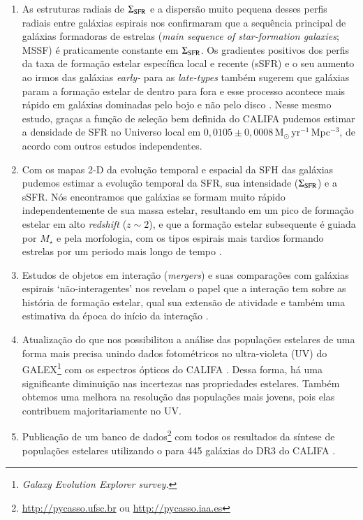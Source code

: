 \begin{enumerate}[label=(\roman*)]
  \item As estruturas radiais de $\Sigma_{\rm SFR}$ e a dispersão muito pequena desses perfis radiais entre galáxias espirais nos confirmaram que a sequência principal de galáxias formadoras de estrelas ({\em main sequence of star-formation galaxies}; MSSF) é praticamente constante em $\Sigma_{\rm SFR}$. Os gradientes positivos dos perfis da taxa de formação estelar específica local e recente (sSFR) e o seu aumento ao irmos das galáxias {\em early-} para as {\em late-types} também sugerem que galáxias param a formação estelar de dentro para fora e esse processo acontece mais rápido em galáxias dominadas pelo bojo e não pelo disco \citep{GonzalezDelgado.etal.2016a}. Nesse mesmo estudo, graças a função de seleção bem definida do CALIFA \citep{Walcher.etal.2014} pudemos estimar a densidade de SFR no Universo local em $0,0105 \pm 0,0008\,$M$_\odot\,$yr$^{-1}\,$Mpc$^{-3}$, de acordo com outros estudos independentes.
  \item Com os mapas 2-D da evolução temporal e espacial da SFH das galáxias pudemos estimar a evolução temporal da SFR, sua intensidade ($\Sigma_{\rm SFR}$) e a sSFR. Nós encontramos que galáxias se formam muito rápido independentemente de sua massa estelar, resultando em um pico de formação estelar em alto {\em redshift} ($z \sim 2$), e que a formação estelar subsequente é guiada por $M_\star$ e pela morfologia, com os tipos espirais mais tardios formando estrelas por um periodo mais longo de tempo \citep{GonzalezDelgado.etal.2017}.
  \item Estudos de objetos em interação ({\em mergers}) e suas comparações com galáxias espirais `não-interagentes' nos revelam o papel que a interação tem sobre as história de formação estelar, qual sua extensão de atividade e também uma estimativa da época do início da interação \citep{CortijoFerrero.etal.2017a, CortijoFerrero.etal.2017b, CortijoFerrero.etal.2017c}.
  \item Atualização do \starlight que nos possibilitou a análise das populações estelares de uma forma mais precisa unindo dados fotométricos no ultra-violeta (UV) do GALEX\footnote{\em Galaxy Evolution Explorer survey.} \citep{Martin.etal.2005} com os espectros ópticos do CALIFA \citep{LopezFernandez.etal.2016}. Dessa forma, há uma significante diminuição nas incertezas nas propriedades estelares. Também obtemos uma melhora na resolução das populações mais jovens, pois elas contribuem majoritariamente no UV.
  \item Publicação de um banco de dados\footnote{\href{http://pycasso.ufsc.br}{http://pycasso.ufsc.br} ou \href{http://pycasso.iaa.es}{http://pycasso.iaa.es}} com todos os resultados da síntese de populações estelares utilizando o \starlight para 445 galáxias do DR3 do CALIFA \citep{deAmorim.etal.2017}.
\end{enumerate}


